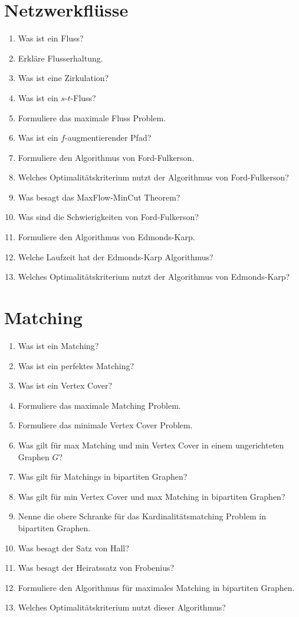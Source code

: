 \documentclass[a4paper,10pt]{scrreprt}
\begin{document}
	\section{Netzwerkflüsse}
	\begin{enumerate}
		\item Was ist ein Fluss?
		\item Erkläre Flusserhaltung.
		\item Was ist eine Zirkulation?
		\item Was ist ein $s$-$t$-Fluss?
		\item Formuliere das maximale Fluss Problem.
		\item Was ist ein $f$-augmentierender Pfad?
		\item Formuliere den Algorithmus von Ford-Fulkerson.
		\item Welches Optimalitätskriterium nutzt der Algorithmus von Ford-Fulkerson?
		\item Was besagt das MaxFlow-MinCut Theorem?
		\item Was sind die Schwierigkeiten von Ford-Fulkerson?
		\item Formuliere den Algorithmus von Edmonds-Karp.
		\item Welche Laufzeit hat der Edmonds-Karp Algorithmus?
		\item Welches Optimalitätskriterium nutzt der Algorithmus von Edmonds-Karp?
	\end{enumerate}
	\section{Matching}
	\begin{enumerate}
		\item Was ist ein Matching?
		\item Was ist ein perfektes Matching?
		\item Was ist ein Vertex Cover?
		\item Formuliere das maximale Matching Problem.
		\item Formuliere das minimale Vertex Cover Problem.
		\item Was gilt für max Matching und min Vertex Cover in einem ungerichteten Graphen $G$?
		\item Was gilt für Matchings in bipartiten Graphen?
		\item Was gilt für min Vertex Cover und max Matching in bipartiten Graphen?
		\item Nenne die obere Schranke für das Kardinalitätsmatching Problem in bipartiten Graphen.
		\item Was besagt der Satz von Hall?
		\item Was besagt der Heiratssatz von Frobenius?
		\item Formuliere den Algorithmus für maximales Matching in bipartiten Graphen.
		\item Welches Optimalitätskriterium nutzt dieser Algorithmus?
	\end{enumerate}	
\end{document}
